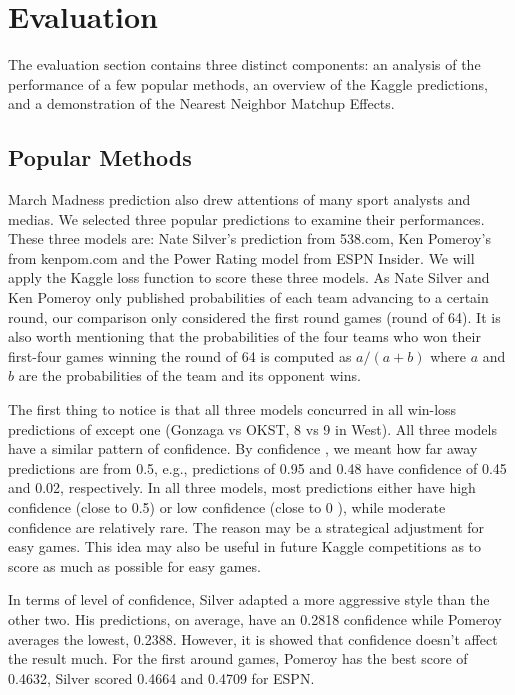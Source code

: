 \section{Evaluation}
The evaluation section contains three distinct components: an analysis of the performance of a few popular methods, an overview of the Kaggle predictions, and a demonstration of the Nearest Neighbor Matchup Effects.
\subsection{Popular Methods}
March Madness prediction also drew attentions of many sport analysts and medias. We selected three popular predictions to examine their performances. These three models are: Nate Silver's prediction from 538.com, Ken Pomeroy's from kenpom.com and the Power Rating model from ESPN Insider. We will apply the Kaggle loss function to score these three models. As Nate Silver and Ken Pomeroy only published probabilities of each team advancing to a certain round, our comparison only considered the first round games (round of 64).  It is also worth mentioning that the probabilities of the four teams who won their first-four games winning the round of 64 is computed as \(a/(a+b)\) where \(a\) and \(b\) are the probabilities of the team and its opponent wins.  

The first thing to notice is that all three models concurred in all win-loss predictions of except one (Gonzaga vs OKST, 8 vs 9 in West). All three models have a similar pattern of confidence. By confidence , we meant how far away predictions are from 0.5, e.g., predictions of 0.95 and 0.48 have confidence of 0.45 and 0.02, respectively. In all three models, most predictions either have high confidence (close to 0.5) or low confidence (close to 0 ), while moderate confidence are relatively rare.  The reason may be a strategical adjustment for easy games. This idea may also be useful in future Kaggle competitions as to score as much as possible for easy games.

In terms of level of confidence, Silver adapted a more aggressive style than the other two. His predictions, on average, have an 0.2818 confidence while Pomeroy averages the lowest, 0.2388. However, it is showed that confidence doesn't affect the result much. For the first around games, Pomeroy has the best score of 0.4632, Silver scored 0.4664 and 0.4709 for ESPN. 

